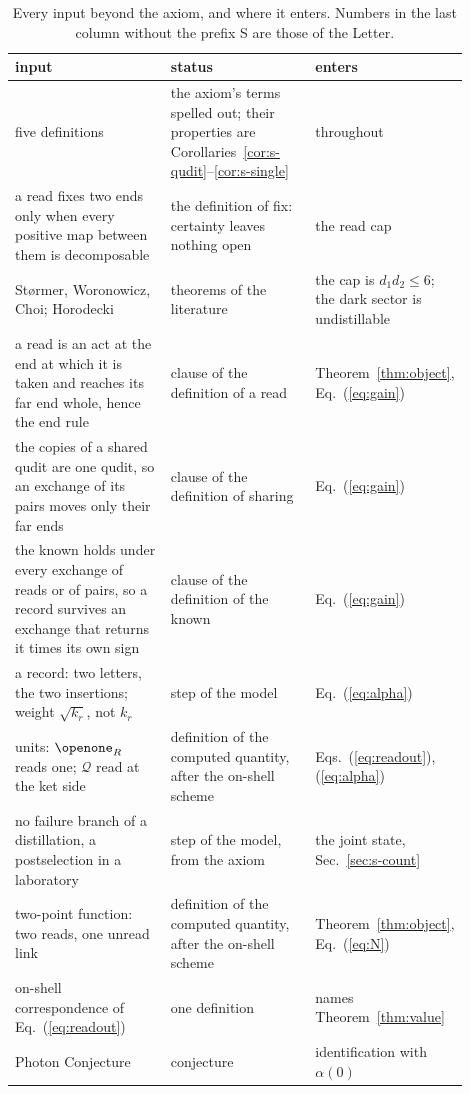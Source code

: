 \begin{table}[h]
\caption{Every input beyond the axiom, and where it enters. Numbers in the last column without the prefix S are those of the Letter.}
\label{tab:inputs}
\footnotesize
\begin{ruledtabular}
\begin{tabular}{>{\raggedright\arraybackslash}p{0.36\linewidth}>{\raggedright\arraybackslash}p{0.33\linewidth}>{\raggedright\arraybackslash}p{0.21\linewidth}}
input & status & enters \\ \hline
five definitions & the axiom's terms spelled out; their properties are Corollaries~\ref{cor:s-qudit}--\ref{cor:s-single} & throughout \\
a read fixes two ends only when every positive map between them is decomposable & the definition of fix: certainty leaves nothing open & the read cap \\
St{\o}rmer, Woronowicz, Choi; Horodecki & theorems of the literature & the cap is $d_{1}d_{2}\leq 6$; the dark sector is undistillable \\
a read is an act at the end at which it is taken and reaches its far end whole, hence the end rule & clause of the definition of a read & Theorem~\ref{thm:object}, Eq.~(\ref{eq:gain}) \\
the copies of a shared qudit are one qudit, so an exchange of its pairs moves only their far ends & clause of the definition of sharing & Eq.~(\ref{eq:gain}) \\
the known holds under every exchange of reads or of pairs, so a record survives an exchange that returns it times its own sign & clause of the definition of the known & Eq.~(\ref{eq:gain}) \\
a record: two letters, the two insertions; weight $\sqrt{k_{r}}$, not $k_{r}$ & step of the model & Eq.~(\ref{eq:alpha}) \\
units: $\openone_{R}$ reads one; $\mathcal{Q}$ read at the ket side & definition of the computed quantity, after the on-shell scheme & Eqs.~(\ref{eq:readout}), (\ref{eq:alpha}) \\
no failure branch of a distillation, a postselection in a laboratory & step of the model, from the axiom & the joint state, Sec.~\ref{sec:s-count} \\
two-point function: two reads, one unread link & definition of the computed quantity, after the on-shell scheme & Theorem~\ref{thm:object}, Eq.~(\ref{eq:N}) \\
on-shell correspondence of Eq.~(\ref{eq:readout}) & one definition & names Theorem~\ref{thm:value} \\
Photon Conjecture & conjecture & identification with $\alpha(0)$ \\
\end{tabular}
\end{ruledtabular}
\end{table}

